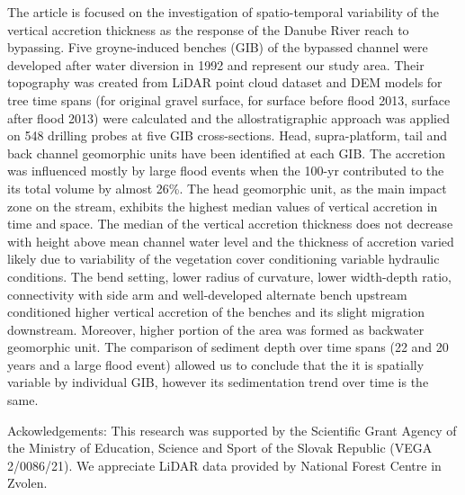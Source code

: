 {The article is focused on the investigation of spatio-temporal variability of the vertical accretion thickness as the response of the Danube River reach to bypassing. Five groyne-induced benches (GIB) of the bypassed channel were developed after water diversion in 1992 and represent our study area. Their topography was created from LiDAR point cloud dataset and DEM models for tree time spans (for original gravel surface, for surface before flood 2013, surface after flood 2013) were calculated and the allostratigraphic approach was applied on 548 drilling probes at five GIB cross-sections.  Head, supra-platform, tail and back channel geomorphic units have been identified at each GIB. The accretion was influenced mostly by large flood events when the 100-yr contributed to the its total volume by almost 26\%. The head geomorphic unit, as the main impact zone on the stream, exhibits the highest median values of vertical accretion in time and space. The median of the vertical accretion thickness does not decrease with height above mean channel water level and the thickness of accretion varied likely due to variability of the vegetation cover conditioning variable hydraulic conditions. The bend setting, lower radius of curvature, lower width-depth ratio, connectivity with side arm and well-developed alternate bench upstream conditioned higher vertical accretion of the benches and its slight migration downstream. Moreover, higher portion of the area was formed as backwater geomorphic unit. The comparison of sediment depth over time spans (22 and 20 years and a large flood event) allowed us to conclude that the it is spatially variable by individual GIB, however its sedimentation trend over time is the same.
	
Ackowledgements: This research was supported by the Scientific Grant Agency of the Ministry of Education, Science and Sport of the Slovak Republic (VEGA 2/0086/21). We appreciate LiDAR data provided by National Forest Centre in Zvolen.
	}%
{}%

